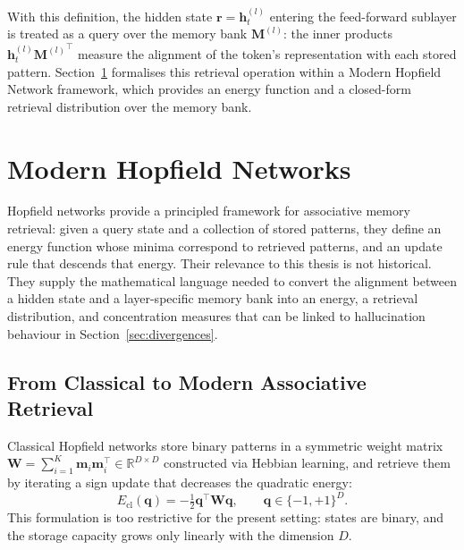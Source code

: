 With this definition, the hidden state $\mathbf{r} = \mathbf{h}_t^{(l)}$ entering
the feed-forward sublayer is treated as a query over the memory bank
$\mathbf{M}^{(l)}$: the inner products $\mathbf{h}_t^{(l)}{\mathbf{M}^{(l)}}^{\!\top}$
measure the alignment of the token's representation with each stored pattern.
Section~\ref{sec:hopfield} formalises this retrieval operation within a Modern
Hopfield Network framework, which provides an energy function and a closed-form
retrieval distribution over the memory bank.
\section{Modern Hopfield Networks}
\label{sec:hopfield}

Hopfield networks provide a principled framework for associative memory retrieval:
given a query state and a collection of stored patterns, they define an energy
function whose minima correspond to retrieved patterns, and an update rule that
descends that energy. Their relevance to this thesis is not historical. They supply
the mathematical language needed to convert the alignment between a hidden state and
a layer-specific memory bank into an energy, a retrieval distribution, and
concentration measures that can be linked to hallucination behaviour in
Section~\ref{sec:divergences}.

\subsection{From Classical to Modern Associative Retrieval}
\label{subsec:classical_to_modern_hopfield}

Classical Hopfield networks \citep{hopfield2007hopfield} store binary patterns in a
symmetric weight matrix $\mathbf{W} = \sum_{i=1}^{K} \mathbf{m}_i\mathbf{m}_i^\top
\in \mathbb{R}^{D \times D}$ constructed via Hebbian learning, and retrieve them by
iterating a sign update that decreases the quadratic energy:
\begin{equation}
    E_{\mathrm{cl}}(\mathbf{q})
    =
    -\tfrac{1}{2}\mathbf{q}^{\top}\mathbf{W}\mathbf{q},
    \qquad \mathbf{q} \in \{-1,+1\}^D.
    \label{eq:classical_hopfield_energy}
\end{equation}
This formulation is too restrictive for the present setting: states are binary, and
the storage capacity grows only linearly with the dimension $D$.

